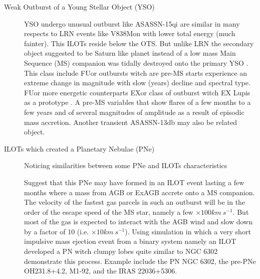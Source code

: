 \documentclass[a4paper,12pt,modern]{aastex62}
\begin{document}
\begin{description}
\begin{description}
\item[Weak Outburst of a Young Stellar Object (YSO)] YSO undergo unusual outburst like ASASSN-15qi \cite{2016ApJ...831..133H} are similar in many respects to LRN events like V838Mon with lower total energy (much fainter). This ILOTs reside below the OTS. But unlike LRN the secondary object suggested to be Saturn like planet instead of a low mass Main Sequence (MS) companion was tidally destroyed onto the primary YSO \citep{2017MNRAS.468.4938K}. This class include FUor outbursts \cite{2014prpl.conf..387A} witch are pre-MS starts  \cite{1966VA......8..109H,1977ApJ...217..693H} experience an extreme change in magnitude with slow (years) decline and spectral type. FUor more energetic counterparts EXor class of outburst \cite{1989ESOC...33..233H} witch EX Lupis as a prototype \cite{2007AJ....133.2679H}. A pre-MS variables that show flares of a few months to a few years and of several magnitudes of amplitude as a result of episodic mass accretion. Another transient ASASSN-13db \cite{2017A&A...607A.127S} may also be related object.

\item[ILOTs which created a Planetary Nebulae (PNe)]
Noticing similarities between some PNe and ILOTs characteristics \cite{2012ApJ...746..100S} 
Suggest that this PNe may have formed in an ILOT event lasting a few months where a mass from AGB or ExAGB accrete onto a MS companion. The velocity of the fastest gas parcels in such an outburst will be in the order of the escape speed of the MS star, namely a few $\times100km~s^{-1}$. But most of the gas is expected to interact with the AGB wind and slow down by a factor of 10 (i.e. $\times10km~s^{-1}$). Using simulation \cite{2013MNRAS.436.1961A} in which a very short impulsive mass ejection event from a binary system namely an ILOT developed a PN witch clumpy lobes  quite similar to NGC 6302 demonstrate this process. Example include the PN NGC 6302, the pre-PNe OH231.8+4.2, M1-92, and the IRAS 22036+5306. 
\end{description}
\end{description}
\end{document}
